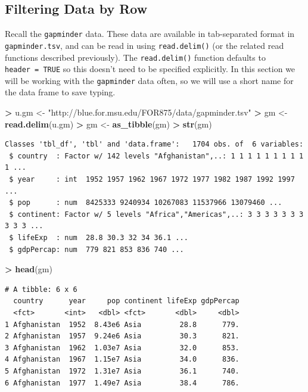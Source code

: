 \documentclass[]{krantz}
\makeatletter
\newenvironment{Shaded}{\begin{snugshade}}{\end{snugshade}}
\newcommand{\KeywordTok}[1]{\textcolor[rgb]{0.27,0.27,0.27}{\textbf{#1}}}
\newcommand{\StringTok}[1]{\textcolor[rgb]{0.5,0.5,0.5}{#1}}
\newcommand{\OperatorTok}[1]{\textcolor[rgb]{0.43,0.43,0.43}{\textbf{#1}}}
\newcommand{\NormalTok}[1]{#1}
\newenvironment{kframe}{%
\medskip{}
\setlength{\fboxsep}{.8em}
 \def\at@end@of@kframe{}%
 \ifinner\ifhmode%
  \def\at@end@of@kframe{\end{minipage}}%
  \begin{minipage}{\columnwidth}%
 \fi\fi%
 \def\FrameCommand##1{\hskip\@totalleftmargin \hskip-\fboxsep
 \colorbox{shadecolor}{##1}\hskip-\fboxsep
     \hskip-\linewidth \hskip-\@totalleftmargin \hskip\columnwidth}%
 \MakeFramed {\advance\hsize-\width
   \@totalleftmargin\z@ \linewidth\hsize
   \@setminipage}}%
 {\par\unskip\endMakeFramed%
 \at@end@of@kframe}
\renewenvironment{Shaded}{\begin{kframe}}{\end{kframe}}
\makeatother
\begin{document}
\subsection{Filtering Data by Row}\label{filtering-data-by-row}

Recall the \texttt{gapminder} data. These data are available in
tab-separated format in \texttt{gapminder.tsv}, and can be read in using
\texttt{read.delim()} (or the related read functions described
previously). The \texttt{read.delim()} function defaults to
\texttt{header\ =\ TRUE} so this doesn't need to be specified
explicitly. In this section we will be working with the
\texttt{gapminder} data often, so we will use a short name for the data
frame to save typing.

\begin{Shaded}
\begin{Highlighting}[]
\OperatorTok{>}\StringTok{ }\NormalTok{u.gm <-}\StringTok{ "http://blue.for.msu.edu/FOR875/data/gapminder.tsv"}
\OperatorTok{>}\StringTok{ }\NormalTok{gm <-}\StringTok{ }\KeywordTok{read.delim}\NormalTok{(u.gm)}
\OperatorTok{>}\StringTok{ }\NormalTok{gm <-}\StringTok{ }\KeywordTok{as_tibble}\NormalTok{(gm)}
\OperatorTok{>}\StringTok{ }\KeywordTok{str}\NormalTok{(gm)}
\end{Highlighting}
\end{Shaded}

\begin{verbatim}
Classes 'tbl_df', 'tbl' and 'data.frame':   1704 obs. of  6 variables:
 $ country  : Factor w/ 142 levels "Afghanistan",..: 1 1 1 1 1 1 1 1 1 1 ...
 $ year     : int  1952 1957 1962 1967 1972 1977 1982 1987 1992 1997 ...
 $ pop      : num  8425333 9240934 10267083 11537966 13079460 ...
 $ continent: Factor w/ 5 levels "Africa","Americas",..: 3 3 3 3 3 3 3 3 3 3 ...
 $ lifeExp  : num  28.8 30.3 32 34 36.1 ...
 $ gdpPercap: num  779 821 853 836 740 ...
\end{verbatim}

\begin{Shaded}
\begin{Highlighting}[]
\OperatorTok{>}\StringTok{ }\KeywordTok{head}\NormalTok{(gm)}
\end{Highlighting}
\end{Shaded}

\begin{verbatim}
# A tibble: 6 x 6
  country      year     pop continent lifeExp gdpPercap
  <fct>       <int>   <dbl> <fct>       <dbl>     <dbl>
1 Afghanistan  1952  8.43e6 Asia         28.8      779.
2 Afghanistan  1957  9.24e6 Asia         30.3      821.
3 Afghanistan  1962  1.03e7 Asia         32.0      853.
4 Afghanistan  1967  1.15e7 Asia         34.0      836.
5 Afghanistan  1972  1.31e7 Asia         36.1      740.
6 Afghanistan  1977  1.49e7 Asia         38.4      786.
\end{verbatim}
\end{document}
